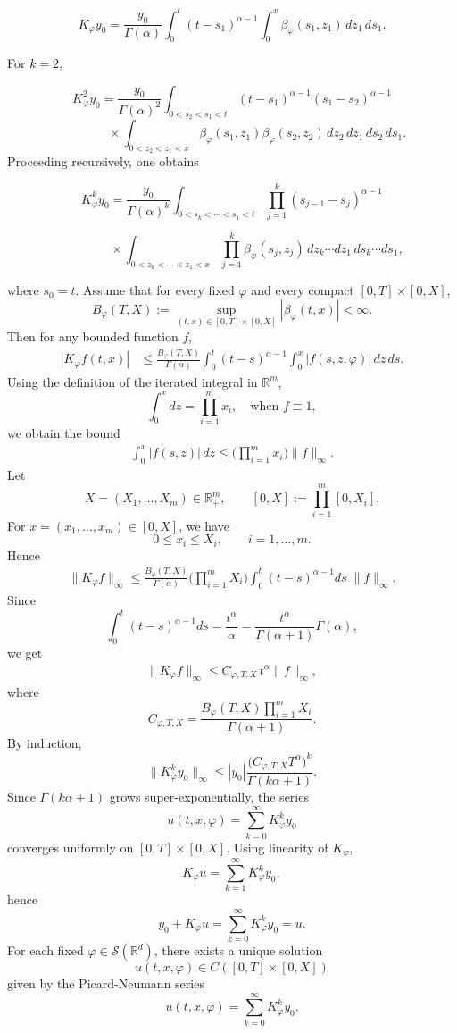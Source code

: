 \documentclass[12pt]{article}%
\numberwithin{equation}{section}
\begin{document}
\[
K_\varphi y_0
=
\frac{y_0}{\Gamma(\alpha)}
\int_0^t
(t-s_1)^{\alpha-1}
\int_0^x
\beta_\varphi(s_1,z_1)\,dz_1\,ds_1.
\]
 
 For $k=2$,

\[
K_\varphi^2 y_0
=
\frac{y_0}{\Gamma(\alpha)^2}
\int_{0<s_2<s_1<t}
(t-s_1)^{\alpha-1}
(s_1-s_2)^{\alpha-1}
\]
\[
\qquad\qquad\times
\int_{0<z_2<z_1<x}
\beta_\varphi(s_1,z_1)
\beta_\varphi(s_2,z_2)
\,dz_2\,dz_1\,ds_2\,ds_1.
\]
Proceeding recursively, one obtains

\[
K_\varphi^k y_0
=
\frac{y_0}{\Gamma(\alpha)^k}
\int_{0<s_k<\cdots<s_1<t}
\prod_{j=1}^{k}
(s_{j-1}-s_j)^{\alpha-1}
\]

\[
\qquad\qquad\times
\int_{0<z_k<\cdots<z_1<x}
\prod_{j=1}^{k}
\beta_\varphi(s_j,z_j)
\,dz_k\cdots dz_1\,
ds_k\cdots ds_1,
\]

where $s_0=t$.
Assume that for every fixed $\varphi$ and every compact $[0,T]\times[0,X]$,
\[
B_\varphi(T,X)
:=
\sup_{(t,x)\in[0,T]\times[0,X]}
|\beta_\varphi(t,x)| < \infty.
\]
Then for any bounded function $f$,
\begin{align}
|K_\varphi f(t,x)|
&\le
\frac{B_\varphi(T,X)}{\Gamma(\alpha)}
\int_0^t (t-s)^{\alpha-1}
\int_0^x |f(s,z,\varphi)|\,dz\,ds.
\end{align}
Using the definition of the iterated integral in $\mathbb{R}^m$,
\[
\int_0^x dz = \prod_{i=1}^m x_i,
\quad \text{when } f \equiv 1,
\]
we obtain the bound
\begin{align}
\int_0^x |f(s,z)|\,dz
\le
\Big(\prod_{i=1}^m x_i\Big)\|f\|_\infty.
\end{align}
Let
\[
X=(X_1,\ldots,X_m)\in\mathbb{R}_+^m,
\qquad
[0,X]:=\prod_{i=1}^m[0,X_i].
\]
For \(x=(x_1,\ldots,x_m)\in[0,X]\), we have
\[
0\leq x_i\leq X_i,\qquad i=1,\ldots,m.
\]
Hence\begin{align}
\|K_\varphi f\|_\infty
\le
\frac{B_\varphi(T,X)}{\Gamma(\alpha)}
\Big(\prod_{i=1}^m X_i\Big)
\int_0^t (t-s)^{\alpha-1} ds\;\|f\|_\infty.
\end{align}
 Since
\[
\int_0^t (t-s)^{\alpha-1} ds
=
\frac{t^\alpha}{\alpha}
=
\frac{t^\alpha}{\Gamma(\alpha+1)}\Gamma(\alpha),
\]
we get
\begin{align}
\|K_\varphi f\|_\infty
\le
C_{\varphi,T,X}\, t^\alpha \|f\|_\infty,
\end{align}
where
\[
C_{\varphi,T,X}
=
\frac{B_\varphi(T,X)\prod_{i=1}^m X_i}{\Gamma(\alpha+1)}.
\]
By induction,
\[
\|K_\varphi^k y_0\|_\infty
\le
|y_0|
\frac{\big(C_{\varphi,T,X} T^\alpha\big)^k}{\Gamma(k\alpha+1)}.
\]
Since $\Gamma(k\alpha+1)$ grows super-exponentially, the series
\[
u(t,x,\varphi)
=
\sum_{k=0}^{\infty} K_\varphi^k y_0
\]
converges uniformly on $[0,T]\times[0,X]$.
Using linearity of $K_\varphi$,
\[
K_\varphi u
=
\sum_{k=1}^{\infty} K_\varphi^k y_0,
\]
hence
\[
y_0 + K_\varphi u
=
\sum_{k=0}^{\infty} K_\varphi^k y_0
=
u.
\]
For each fixed $\varphi \in \mathcal{S}(\mathbb{R}^d)$, there exists a unique solution
\[
u(t,x,\varphi)
\in C([0,T]\times[0,X])
\]
given by the Picard-Neumann series
\begin{equation}
    u(t,x,\varphi)
=
\sum_{k=0}^{\infty} K_\varphi^k y_0.
\end{equation}
\end{document}
